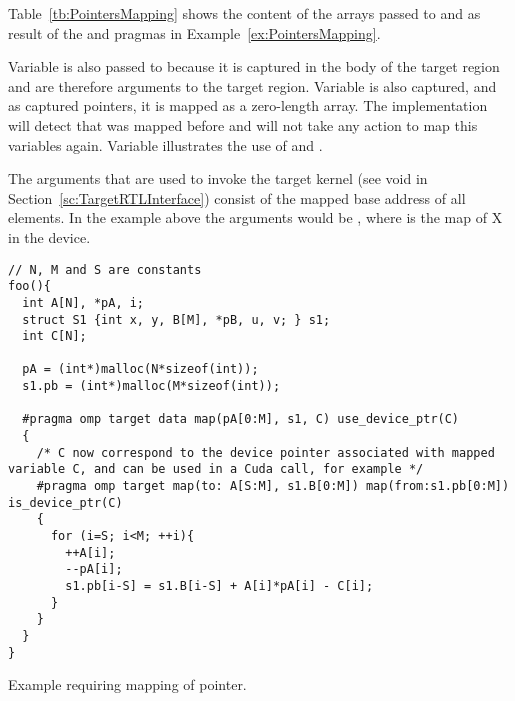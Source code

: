 Table~\ref{tb:PointersMapping} shows the content of the arrays passed to  and  as result of the \dtargetdata{} and \dtarget{} pragmas in Example~\ref{ex:PointersMapping}.

Variable  is also passed to  because it is captured in the body of the target region and are therefore arguments to the target region. Variable  is also captured, and as captured pointers, it is mapped as a zero-length array. The \libomptarget{} implementation will detect that  was mapped before and will not take any action to map this variables again. Variable  illustrates the use of  and .

The arguments that are used to invoke the target kernel (see void  in Section~\ref{sc:TargetRTLInterface}) consist of the mapped base address of all elements. In the example above the arguments would be , where  is the map of {X} in the device.

\begin{example}
\lstset{basicstyle=\scriptsize,frame=single}
\begin{lstlisting}
// N, M and S are constants
foo(){
  int A[N], *pA, i;
  struct S1 {int x, y, B[M], *pB, u, v; } s1;
  int C[N];
  
  pA = (int*)malloc(N*sizeof(int)); 
  s1.pb = (int*)malloc(M*sizeof(int)); 

  #pragma omp target data map(pA[0:M], s1, C) use_device_ptr(C)
  { 
    /* C now correspond to the device pointer associated with mapped variable C, and can be used in a Cuda call, for example */
    #pragma omp target map(to: A[S:M], s1.B[0:M]) map(from:s1.pb[0:M]) is_device_ptr(C)
    {
      for (i=S; i<M; ++i){ 
        ++A[i]; 
        --pA[i]; 
        s1.pb[i-S] = s1.B[i-S] + A[i]*pA[i] - C[i]; 
      }
    }
  }
}
\end{lstlisting}
\lstset{basicstyle=\small\bfseries,frame=none}
\caption{Example requiring mapping of pointer.}
\label{ex:PointersMapping}
\end{example}

